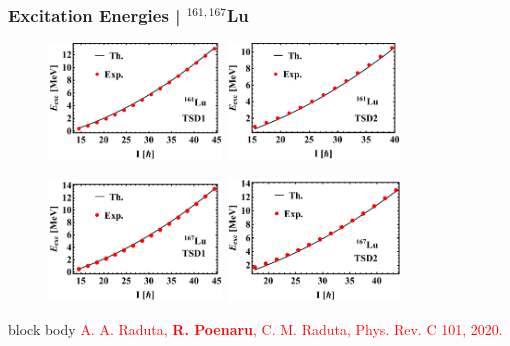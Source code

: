 \documentclass{beamer}
\begin{document}
\begin{frame}
	\frametitle{Excitation Energies | $^{161,167}$Lu}
	\begin{figure}
		\centering
		\includegraphics[width=0.41\textwidth]{figures/Lu-exp-energies/fig2a_lu161.pdf}
		\includegraphics[width=0.41\textwidth]{figures/Lu-exp-energies/fig2b_lu161.pdf}
	\end{figure}
	\vspace{-0.5cm}
	\begin{figure}
		\centering
		\includegraphics[width=0.41\textwidth]{figures/Lu-exp-energies/fig5a_lu167.pdf}
		\includegraphics[width=0.41\textwidth]{figures/Lu-exp-energies/fig5b_lu167.pdf}
	\end{figure}
	\vspace{-0.2cm}
	\begin{beamercolorbox}[rounded=true,shadow=false, wd=\linewidth,]{block body}
		\centering
		\textcolor{red}{\footnotesize{A. A. Raduta, \textbf{R. Poenaru}, C. M. Raduta, Phys. Rev. C 101, 2020.}}
	\end{beamercolorbox}
\end{frame}
\end{document}
